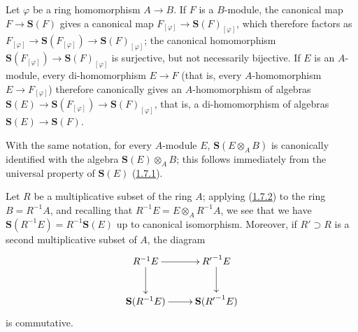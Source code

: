 \begin{env}[1.7.2]
\label{II.1.7.2}
Let $\varphi$ be a ring homomorphism $A\to B$. If $F$ is a $B$-module,
the canonical map $F\to\mathbf{S}(F)$ gives a canonical map
$F_{[\varphi]}\to\mathbf{S}(F)_{[\varphi]}$, which therefore factors as
$F_{[\varphi]}\to\mathbf{S}(F_{[\varphi]})\to
\mathbf{S}(F)_{[\varphi]}$; the canonical homomorphism
$\mathbf{S}(F_{[\varphi]})\to\mathbf{S}(F)_{[\varphi]}$ is surjective, but
not necessarily bijective. If $E$ is an $A$-module, every di-homomorphism
$E\to F$ (that is, every $A$-homomorphism $E\to F_{[\varphi]}$) therefore
canonically gives an $A$-homomorphism of algebras
$\mathbf{S}(E)\to\mathbf{S}(F_{[\varphi]})\to
\mathbf{S}(F)_{[\varphi]}$, that is, a di-homomorphism of algebras
$\mathbf{S}(E)\to\mathbf{S}(F)$.

With the same notation, for every $A$-module $E$,
$\mathbf{S}(E\otimes_A B)$ is canonically identified with the algebra
$\mathbf{S}(E)\otimes_A B$; this follows immediately from the universal
property of $\mathbf{S}(E)$ (\hyperref[II.1.7.1]{1.7.1}).
\end{env}

\begin{env}[1.7.3]
\label{II.1.7.3}
Let $R$ be a multiplicative subset of the ring $A$; applying
(\hyperref[II.1.7.2]{1.7.2}) to the ring $B=R^{-1}A$, and recalling that
$R^{-1}E=E\otimes_A R^{-1}A$, we see that we have
$\mathbf{S}(R^{-1}E)=R^{-1}\mathbf{S}(E)$ up to canonical isomorphism.
Moreover, if $R'\supset R$ is a second multiplicative subset of $A$, the
diagram
\[
  \xymatrix{
    R^{-1}E\ar[r]\ar[d] & {R'}^{-1}E\ar[d]\\
    \mathbf{S}(R^{-1}E)\ar[r] & \mathbf{S}({R'}^{-1}E)
  }
\]
is commutative.
\end{env}

